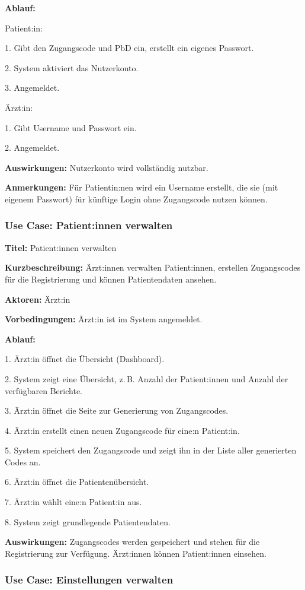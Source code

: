 \textbf{Ablauf:}  

Patient:in: 

1. Gibt den Zugangscode und PbD ein, erstellt ein eigenes Passwort.  

2. System aktiviert das Nutzerkonto.  

3. Angemeldet.

Ärzt:in:

1. Gibt Username und Passwort ein.

2. Angemeldet.

\textbf{Auswirkungen:}  
Nutzerkonto wird vollständig nutzbar.

\textbf{Anmerkungen:}  
Für Patientin:nen wird ein Username erstellt, die sie (mit eigenem Passwort) für künftige Login ohne Zugangscode nutzen können. 


\subsubsection*{Use Case: Patient:innen verwalten}

\textbf{Titel:} Patient:innen verwalten

\textbf{Kurzbeschreibung:}
Ärzt:innen verwalten Patient:innen, erstellen Zugangscodes für die Registrierung und können Patientendaten ansehen.

\textbf{Aktoren:}
Ärzt:in

\textbf{Vorbedingungen:}
Ärzt:in ist im System angemeldet.

\textbf{Ablauf:}

1. Ärzt:in öffnet die Übersicht (Dashboard).

2. System zeigt eine Übersicht, z.\,B. Anzahl der Patient:innen und Anzahl der verfügbaren Berichte.

3. Ärzt:in öffnet die Seite zur Generierung von Zugangscodes.

4. Ärzt:in erstellt einen neuen Zugangscode für eine:n Patient:in.

5. System speichert den Zugangscode und zeigt ihn in der Liste aller generierten Codes an.

6. Ärzt:in öffnet die Patientenübersicht.

7. Ärzt:in wählt eine:n Patient:in aus.

8. System zeigt grundlegende Patientendaten.

\textbf{Auswirkungen:}
Zugangscodes werden gespeichert und stehen für die Registrierung zur Verfügung. Ärzt:innen können Patient:innen einsehen.

\subsubsection*{Use Case: Einstellungen verwalten}

